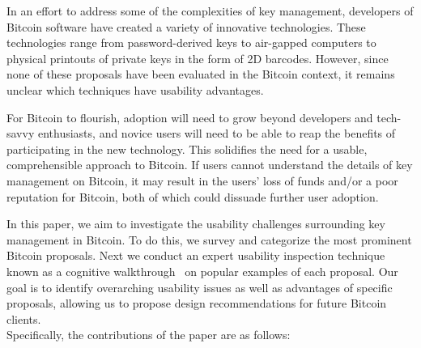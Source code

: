 In an effort to address some of the complexities of key management, developers of Bitcoin software have created a variety of innovative technologies. These technologies range  from password-derived keys to air-gapped computers to physical printouts of private keys in the form of 2D barcodes. However, since none of these proposals have been evaluated in the Bitcoin context, it remains unclear which techniques have usability advantages.

For Bitcoin to flourish, adoption will need to grow beyond developers and tech-savvy enthusiasts, and novice users will need to be able to reap the benefits of participating in the new technology. This solidifies the need for a usable, comprehensible approach to Bitcoin. If users cannot understand the details of key management on Bitcoin, it may result in the users' loss of funds and/or a poor reputation for Bitcoin, both of which could dissuade further user adoption. 

In this paper, we aim to investigate the usability challenges surrounding key management in Bitcoin. To do this, we survey and categorize the most prominent Bitcoin proposals. Next we conduct an expert usability inspection technique known as a cognitive walkthrough~\cite{WRLP94} on popular examples of each proposal. Our goal is to identify overarching usability issues as well as advantages of specific proposals, allowing us to propose design recommendations for future Bitcoin clients. \\



Specifically, the contributions of the paper are as follows:

